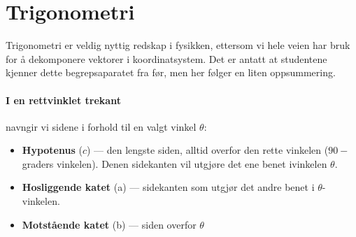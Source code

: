 
\section{Trigonometri}

Trigonometri er veldig nyttig redskap i fysikken, ettersom vi hele veien har bruk for å dekomponere vektorer i koordinatsystem. Det er antatt at studentene kjenner dette begrepsaparatet fra før, men her følger en liten oppsummering.

\paragraph{I en rettvinklet trekant} navngir vi sidene i forhold til en valgt vinkel $\theta$:
\begin{itemize}
    \item \textbf{Hypotenus} ($c$) — den lengste siden, alltid overfor den rette vinkelen ($90-$graders vinkelen). Denen sidekanten vil utgjøre det ene benet ivinkelen $\theta$.
    \item \textbf{Hosliggende katet} (a) — sidekanten som utgjør det andre benet i $\theta$-vinkelen.
    \item \textbf{Motstående katet} (b) — siden overfor $\theta$
\end{itemize}

